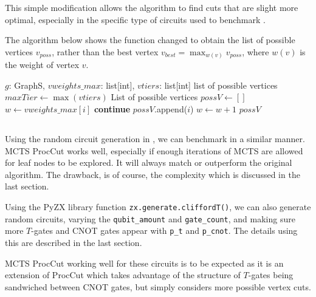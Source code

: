 \documentclass[11pt]{article} %
\theoremstyle{definition}
\begin{document}
This simple modification allows the algorithm to find cuts that are slight more optimal,
especially in the specific type of circuits used to benchmark \cite{sutcliffe2024procedurally}.

The algorithm below shows the function changed to obtain the list of possible vertices $v_{poss}$,
rather than the best vertex $v_{best} = \max_{w(v)} v_{poss}$, where $w(v)$ is the weight of vertex $v$.

\begin{algorithm}[H]
\caption{bestCut}
\label{alg:bestCutM}
\begin{algorithmic}[1]
\Require $g$: GraphS, $vweights\_max$: list[int], $vtiers$: list[int]
\Ensure list of possible vertices
\State $maxTier \gets \max(vtiers)$
\State List of possible vertices $possV \gets []$
    \State $w \gets vweights\_max[i]$
        \State \textbf{continue}
    \EndIf
    \State $possV$.append($i$)
        \State $w \gets w + 1$ 
    \EndIf
\EndFor
\State \Return $possV$
\end{algorithmic}
\end{algorithm}


\subsection{}
Using the random circuit generation in \cite{sutcliffe2024procedurally},
we can benchmark in a similar manner.
MCTS ProcCut works well, especially if enough iterations of MCTS are allowed for leaf nodes to be explored.
It will always match or outperform the original algorithm.
The drawback, is of course, the complexity which is discussed in the last section.

Using the PyZX library \cite{kissinger2020Pyzx} function \texttt{zx.generate.cliffordT()}, 
we can also generate random circuits, varying the \texttt{qubit\_amount} and \texttt{gate\_count},
and making sure more $T$-gates and CNOT gates appear with 
\texttt{p\_t} and \texttt{p\_cnot}.
The details using this are described in the last section.

MCTS ProcCut working well for these circuits is to be expected 
as it is an extension of ProcCut \cite{sutcliffe2024procedurally} 
which takes advantage of the structure of $T$-gates being sandwiched between CNOT gates,
but simply considers more possible vertex cuts.
\end{document}
